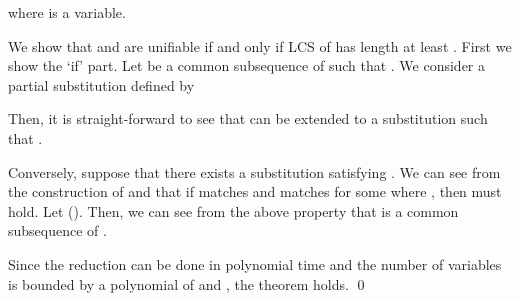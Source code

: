 \documentclass[a4paper]{llncs}
\begin{document}
where  is a variable.

We show that  and  are unifiable if and only if
LCS of  has length at least .
First we show the `if' part.
Let  be a common subsequence of  such that .
We consider a partial substitution  defined by

Then, it is straight-forward to see
that  can be extended to a substitution  such
that .

Conversely, suppose that there exists a substitution  satisfying
.
We can see from the construction of  and  that
if  matches  and  matches 
for some  where ,
then  must hold.
Let  ().
Then, we can see from the above property that
 is a common subsequence of .

Since the reduction can be done in polynomial time and
the number of variables is bounded by a polynomial of  and ,
the theorem holds.
\qed
\end{document}
